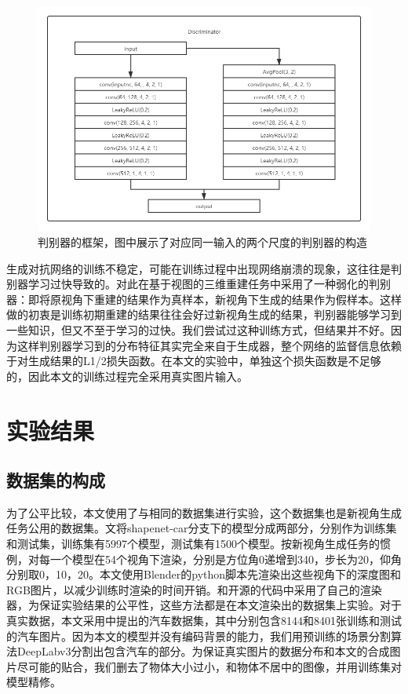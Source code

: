 \documentclass[UTF8,openany,AutoFakeBold,AutoFakeSlant,cs4size]{ctexbook}
\begin{document}
\begin{figure}
\centering
\includegraphics[width=15cm]{./images/discriminator.png}
\caption{判别器的框架，图中展示了对应同一输入的两个尺度的判别器的构造}
\label{fig:sample}
\end{figure}

生成对抗网络的训练不稳定，可能在训练过程中出现网络崩溃的现象，这往往是判别器学习过快导致的。对此\cite{kato2019vpl}在基于视图的三维重建任务中采用了一种弱化的判别器：即将原视角下重建的结果作为真样本，新视角下生成的结果作为假样本。这样做的初衷是训练初期重建的结果往往会好过新视角生成的结果，判别器能够学习到一些知识，但又不至于学习的过快。我们尝试过这种训练方式，但结果并不好。因为这样判别器学习到的分布特征其实完全来自于生成器，整个网络的监督信息依赖于对生成结果的L1/2损失函数。在本文的实验中，单独这个损失函数是不足够的，因此本文的训练过程完全采用真实图片输入。

\section{实验结果}

\subsection{数据集的构成}

为了公平比较，本文使用了与\cite{Zhou2016ViewSB}相同的数据集进行实验，这个数据集也是新视角生成任务公用的数据集。\cite{Zhou2016ViewSB}文将shapenet-car分支下的模型分成两部分，分别作为训练集和测试集，训练集有5997个模型，测试集有1500个模型。按新视角生成任务的惯例，对每一个模型在54个视角下渲染，分别是方位角0递增到340，步长为20，仰角分别取0，10，20。本文使用Blender的python脚本先渲染出这些视角下的深度图和RGB图片，以减少训练时渲染的时间开销。\cite{Zhou2016ViewSB}和\cite{Su2015MultiviewCN}开源的代码中采用了自己的渲染器，为保证实验结果的公平性，这些方法都是在本文渲染出的数据集上实验。对于真实数据，本文采用\cite{6755945}中提出的汽车数据集，其中分别包含8144和8401张训练和测试的汽车图片。因为本文的模型并没有编码背景的能力，我们用预训练的场景分割算法DeepLabv3\cite{Chen2017RethinkingAC}分割出包含汽车的部分。为保证真实图片的数据分布和本文的合成图片尽可能的贴合，我们删去了物体大小过小，和物体不居中的图像，并用训练集对模型精修。
\end{document}
